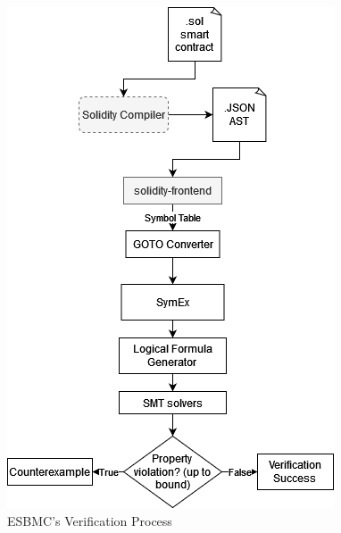 \begin{figure}[h]
\centering
\includegraphics{ESBMC_process.png}
\caption{ESBMC's Verification Process \cite{song2022esbmc}}
\label{fig:ESBMC_process}
\end{figure}